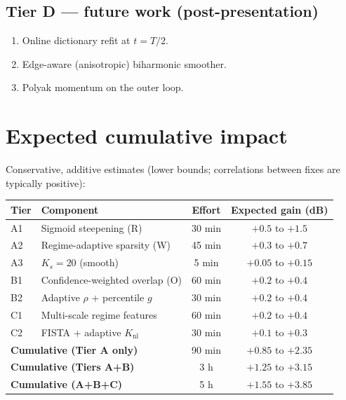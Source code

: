 \documentclass[11pt,a4paper]{article}
\begin{document}
\subsection*{Tier D --- future work (post-presentation)}

\begin{enumerate}[leftmargin=2em,label=D\arabic*.]
    \item Online dictionary refit at $t = T/2$.
    \item Edge-aware (anisotropic) biharmonic smoother.
    \item Polyak momentum on the outer loop.
\end{enumerate}

\section{Expected cumulative impact}

Conservative, additive estimates (lower bounds; correlations between
fixes are typically positive):

\begin{center}
\begin{tabular}{l l c c}
    \toprule
    Tier & Component & Effort & Expected gain (dB) \\
    \midrule
    A1   & Sigmoid steepening (R)              & 30 min & $+0.5$ to $+1.5$ \\
    A2   & Regime-adaptive sparsity (W)        & 45 min & $+0.3$ to $+0.7$ \\
    A3   & $K_s = 20$ (smooth)                 &  5 min & $+0.05$ to $+0.15$ \\
    \midrule
    B1   & Confidence-weighted overlap (O)     & 60 min & $+0.2$ to $+0.4$ \\
    B2   & Adaptive $\rho$ + percentile $g$    & 30 min & $+0.2$ to $+0.4$ \\
    \midrule
    C1   & Multi-scale regime features         & 60 min & $+0.2$ to $+0.4$ \\
    C2   & FISTA + adaptive $K_{\mathrm{nl}}$  & 30 min & $+0.1$ to $+0.3$ \\
    \midrule
    \multicolumn{2}{l}{\textbf{Cumulative (Tier A only)}} & 90 min   & $+0.85$ to $+2.35$ \\
    \multicolumn{2}{l}{\textbf{Cumulative (Tiers A+B)}}   & 3 h      & $+1.25$ to $+3.15$ \\
    \multicolumn{2}{l}{\textbf{Cumulative (A+B+C)}}       & 5 h      & $+1.55$ to $+3.85$ \\
    \bottomrule
\end{tabular}
\end{center}
\end{document}

